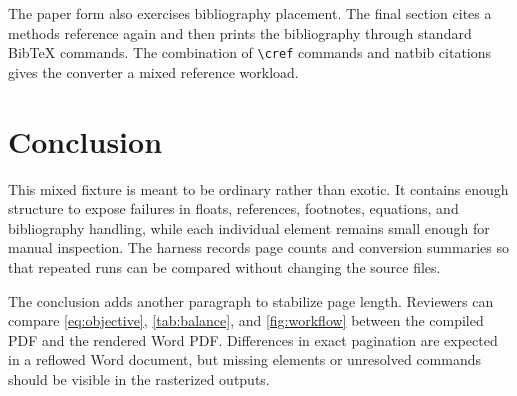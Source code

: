 \documentclass[11pt]{article}
\begin{document}
The paper form also exercises bibliography placement. The final section cites a
methods reference again \citep{imbens2015causal} and then prints the bibliography
through standard BibTeX commands. The combination of \verb|\cref| commands and
natbib citations gives the converter a mixed reference workload.

\section{Conclusion}
\label{sec:conclusion}

This mixed fixture is meant to be ordinary rather than exotic. It contains enough
structure to expose failures in floats, references, footnotes, equations, and
bibliography handling, while each individual element remains small enough for
manual inspection. The harness records page counts and conversion summaries so
that repeated runs can be compared without changing the source files.

The conclusion adds another paragraph to stabilize page length. Reviewers can
compare \cref{eq:objective}, \cref{tab:balance}, and \cref{fig:workflow} between
the compiled PDF and the rendered Word PDF. Differences in exact pagination are
expected in a reflowed Word document, but missing elements or unresolved commands
should be visible in the rasterized outputs.



\end{document}
